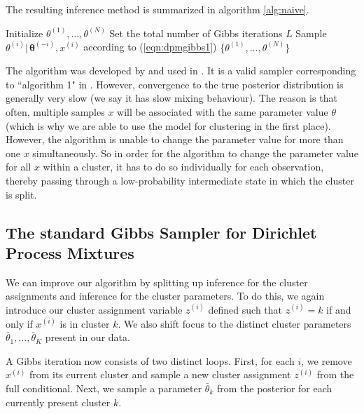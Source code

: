 \documentclass[final,3p,times,twocolumn]{elsarticle}
\let\bs\boldsymbol
\begin{document}
The resulting inference method is summarized in algorithm \ref{alg:naive}.
\begin{algorithm}
\caption{Na{\"i}ve Gibbs sampler for DP mixtures}
\label{alg:naive}
\begin{algorithmic}[1]
\State Initialize $\theta^{(1)},\dots,\theta^{(N)}$
\State Set the total number of Gibbs iterations $L$
\State Sample $\theta^{(i)}|\,\bs\theta^{(-i)},x^{(i)}$ according to (\ref{eqn:dpmgibbs1})
\EndFor
\EndFor
\State\Return $\{\theta^{(1)},\dots,\theta^{(N)}\}$
\end{algorithmic}
\end{algorithm}

The algorithm was developed by \cite{escobar1994} and used in \cite{escobar1995}.
It is a valid sampler corresponding to ``algorithm 1" in \cite{neal2000}.
However, convergence to the true posterior distribution is generally very slow (we say it has slow mixing behaviour).
The reason is that often, multiple samples $x$ will be associated with the same parameter value $\theta$ (which is why we are able to use the model for clustering in the first place).
However, the algorithm is unable to change the parameter value for more than one $x$ simultaneously. 
So in order for the algorithm to change the parameter value for all $x$ within a cluster, it has to do so individually for each observation, thereby passing through a low-probability intermediate state in which the cluster is split.

\subsection{The standard Gibbs Sampler for Dirichlet Process Mixtures}
We can improve our algorithm by splitting up inference for the cluster assignments and inference for the cluster parameters.
To do this, we again introduce our cluster assignment variable $z^{(i)}$ defined such that $z^{(i)}=k$ if and only if $x^{(i)}$ is in cluster $k$.
We also shift focus to the distinct cluster parameters $\bar \theta_1,\dots,\bar \theta_K$ present in our data. 

A Gibbs iteration now consists of two distinct loops.
First, for each $i$, we remove $x^{(i)}$ from its current cluster and sample a new cluster assignment $z^{(i)}$ from the full conditional.
Next, we sample a parameter $\bar \theta_k$ from the posterior for each currently present cluster $k$.
\end{document}
